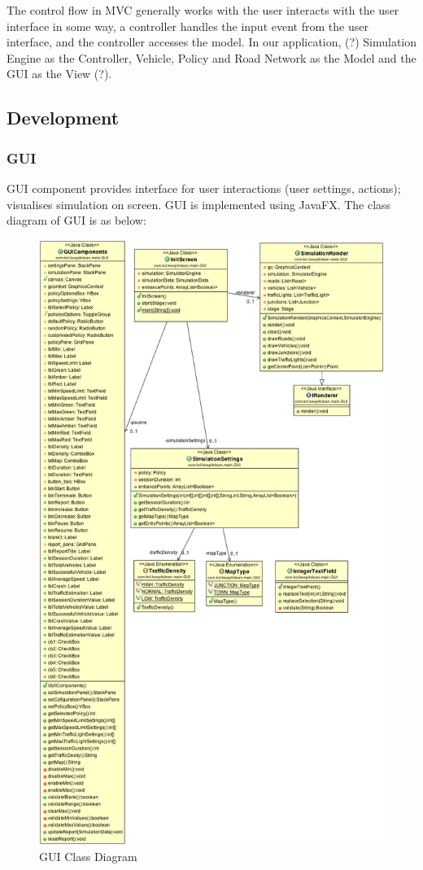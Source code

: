 \documentclass[11pt]{article}
\begin{document}
{\begin{itemize}
The control flow in MVC generally works with the user interacts with the user interface in some way, a controller handles the input event from the user interface, and the controller accesses the model. In our application, (?)
Simulation Engine as the Controller, Vehicle, Policy and Road Network as the Model and the GUI as the View (?). 


\subsection{Development}
\subsubsection{GUI}
GUI component provides interface for user interactions (user settings, actions); visualises simulation on screen. GUI is implemented using JavaFX. The class diagram of GUI is as below:
    \begin{figure}[H]
        \includegraphics[width=16cm]{GUI} 
        \caption{GUI Class Diagram } 
        \label{gui}
    \end{figure}
    

\end{itemize}}
\end{document}
